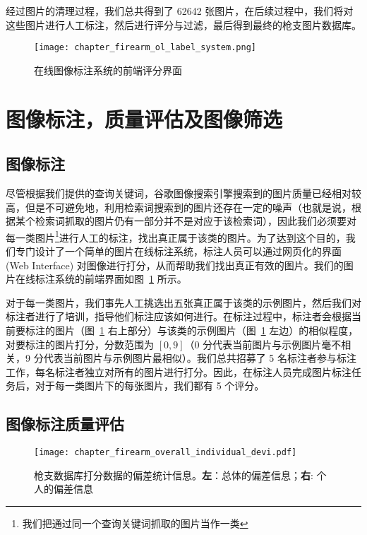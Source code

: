 经过图片的清理过程，我们总共得到了 62642 张图片，在后续过程中，我们将对这些图片进行人工标注，然后进行评分与过滤，最后得到最终的枪支图片数据库。

\begin{figure}[!t]
	\centering
	\texttt{[image: chapter\_firearm\_ol\_label\_system.png]}
	\caption{在线图像标注系统的前端评分界面}
	\label{fig:online_label_system}
\end{figure}

\section{图像标注，质量评估及图像筛选}\label{sec:image_label_filtering}

\subsection{图像标注}
尽管根据我们提供的查询关键词，谷歌图像搜索引擎搜索到的图片质量已经相对较高，但是不可避免地，利用检索词搜索到的图片还存在一定的噪声（也就是说，根据某个检索词抓取的图片仍有一部分并不是对应于该检索词），因此我们必须要对每一类图片\footnote{我们把通过同一个查询关键词抓取的图片当作一类}进行人工的标注，找出真正属于该类的图片。为了达到这个目的，我们专门设计了一个简单的图片在线标注系统，标注人员可以通过网页化的界面 (Web Interface) 对图像进行打分，从而帮助我们找出真正有效的图片。我们的图片在线标注系统的前端界面如图~\ref{fig:online_label_system} 所示。

对于每一类图片，我们事先人工挑选出五张真正属于该类的示例图片，然后我们对标注者进行了培训，指导他们标注应该如何进行。在标注过程中，标注者会根据当前要标注的图片（图~\ref{fig:online_label_system} 右上部分）与该类的示例图片（图~\ref{fig:online_label_system} 左边）的相似程度，对要标注的图片打分，分数范围为 $[0,9]$（0 分代表当前图片与示例图片毫不相关，9 分代表当前图片与示例图片最相似）。我们总共招募了 5 名标注者参与标注工作，每名标注者独立对所有的图片进行打分。因此，在标注人员完成图片标注任务后，对于每一类图片下的每张图片，我们都有 5 个评分。

\subsection{图像标注质量评估}

\begin{figure}[t]
	\centering
	\texttt{[image: chapter\_firearm\_overall\_individual\_devi.pdf]}
	\caption[枪支数据库打分数据的偏差统计信息]{枪支数据库打分数据的偏差统计信息。\textbf{左}：总体的偏差信息；\textbf{右}: 个人的偏差信息}
	\label{fig:deviation_info}
\end{figure}

